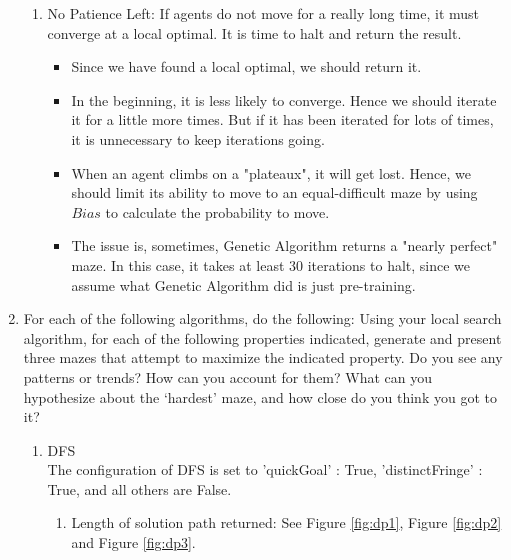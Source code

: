 \documentclass[letter]{article}
\begin{document}
\begin{enumerate}[resume]
\begin{enumerate}
			\item {No Patience Left: If agents do not move for a really long time, it must converge at a local optimal. It is time to halt and return the result.} 
			\begin{itemize}
				\item {Since we have found a local optimal, we should return it.}
				\item {In the beginning, it is less likely to converge. Hence we should iterate it for a little more times. But if it has been iterated for lots of times, it is unnecessary to keep iterations going.}
				\item {When an agent climbs on a "plateaux", it will get lost. Hence, we should limit its ability to move to an equal-difficult maze by using $Bias$ to calculate the probability to move.}
				\item {The issue is, sometimes, Genetic Algorithm returns a "nearly perfect" maze. In this case, it takes at least 30 iterations to halt, since we assume what Genetic Algorithm did is just pre-training.}
			\end{itemize}
		\end{enumerate}
		
		\item {For each of the following algorithms, do the following: Using your local search algorithm, for each of the following properties indicated, generate and present three mazes that attempt to maximize the indicated property. Do you see any patterns or trends? How can you account for them? What can you hypothesize about the ‘hardest’ maze, and how close do you think you got to it?}
		\begin{enumerate}
			\item {DFS} \\
			The configuration of DFS is set to 'quickGoal' : True, 'distinctFringe' : True, and all others are False.
			\begin{enumerate}
				\item {Length of solution path returned: See Figure \ref{fig:dp1}, Figure \ref{fig:dp2} and Figure \ref{fig:dp3}.} \\
				\begin{figure}
					\minipage{\textwidth}
					

\end{figure}
\end{enumerate}
\end{enumerate}
\end{enumerate}
\end{document}
